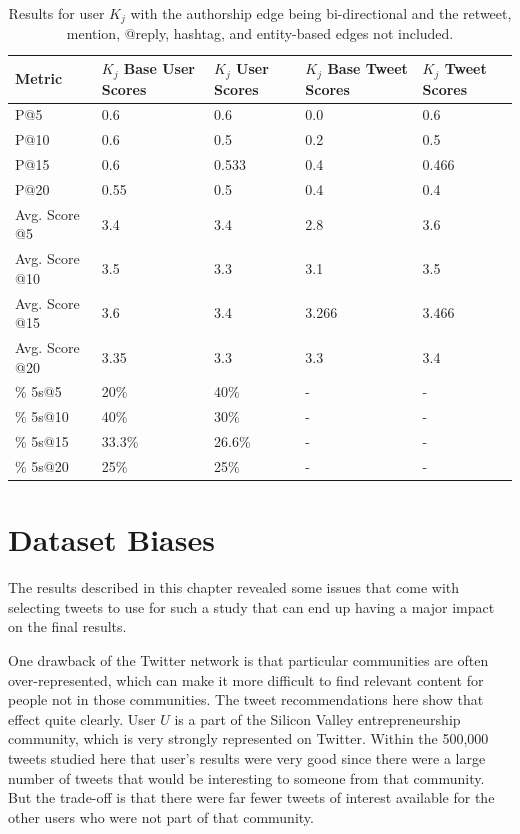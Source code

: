 \begin{table}
\centering
\begin{tabular}{l|p{2.2cm}|p{2.2cm}|p{2.2cm}|p{2.2cm}}
{\bf Metric} & {\bf $K_{j}$ Base User Scores} & {\bf $K_{j}$ User Scores} & {\bf $K_{j}$ Base Tweet Scores} & {\bf $K_{j}$ Tweet Scores} \\ \hline
P@5   & 0.6 & 0.6 & 0.0 & 0.6 \\ \hline
P@10 & 0.6 & 0.5 & 0.2 & 0.5 \\ \hline
P@15 & 0.6 & 0.533 & 0.4 & 0.466 \\ \hline
P@20 & 0.55 & 0.5 & 0.4 & 0.4 \\ \hline

Avg. Score @5   & 3.4 & 3.4 & 2.8 & 3.6 \\ \hline
Avg. Score @10 & 3.5 & 3.3 & 3.1 & 3.5 \\ \hline
Avg. Score @15 & 3.6 & 3.4 & 3.266 & 3.466 \\ \hline
Avg. Score @20 & 3.35 & 3.3 & 3.3 & 3.4 \\ \hline

\% 5s@5    & 20\% & 40\% & - & - \\ \hline
\% 5s@10  & 40\% & 30\% & - & - \\ \hline
\% 5s@15  & 33.3\% & 26.6\% & - & - \\ \hline
\% 5s@20  & 25\% & 25\% & - & - \\

\end{tabular}
\caption{Results for user $K_{j}$ with the authorship edge being bi-directional and the retweet, mention, @reply, hashtag, and entity-based edges not included.}
\label{tab:BiAuthorNo369NoContent}
\end{table}



\section{Dataset Biases}

The results described in this chapter revealed some issues that come with selecting tweets to use for such a study that can end up having a major impact on the final results.

One drawback of the Twitter network is that particular communities are often over-represented, which can make it more difficult to find relevant content for people not in those communities. The tweet recommendations here show that effect quite clearly. User $U$ is a part of the Silicon Valley entrepreneurship community, which is very strongly represented on Twitter. Within the 500,000 tweets studied here that user's results were very good since there were a large number of tweets that would be interesting to someone from that community. But the trade-off is that there were far fewer tweets of interest available for the other users who were not part of that community.

